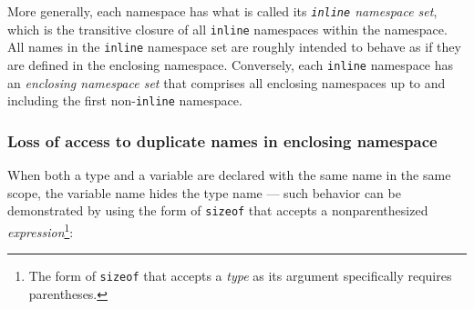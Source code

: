 %
%
%
% 
%

More generally, each namespace has what is called its
\emph{\lstinline!inline! namespace set}, which is the transitive closure of
all \lstinline!inline! namespaces within the namespace. All names in the
\lstinline!inline! namespace set are roughly intended to behave as if they
are defined in the enclosing namespace. Conversely, each \lstinline!inline!
namespace has an \emph{enclosing namespace set} that comprises all
enclosing namespaces up to and including the first non-\lstinline!inline!
namespace.

\subsubsection[Loss of access to duplicate names in enclosing namespace]{Loss of access to duplicate names in enclosing namespace}\label{loss-of-access-to-duplicate-names-in-enclosing-namespace}

When both a type and a variable are declared with the same name in the
same scope, the variable name hides the type name --- such behavior can
be demonstrated by using the form of \lstinline!sizeof! that accepts a
nonparenthesized \emph{expression}{\cprotect\footnote{The form of
\lstinline!sizeof! that accepts a \emph{type} as its argument
  specifically requires parentheses.}}:

